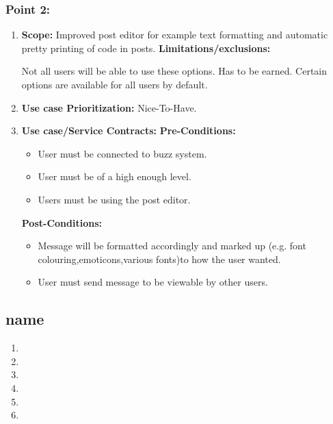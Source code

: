 \documentclass[11pt]{article}
\begin{document}
\subsubsection{Point 2:} 
\begin{enumerate}
\item 
\textbf{Scope:}
Improved post editor for example text formatting and automatic pretty printing of code in posts.
\newline
\textbf{Limitations/exclusions:} 

Not all users will be able to use these options. Has to be earned. Certain options are available for all users by default.

\item 
\textbf{Use case Prioritization:} Nice-To-Have.

\item 
\textbf{Use case/Service Contracts:} 
\newline
\textbf{Pre-Conditions: }
\begin{itemize}
\item User must be connected to buzz system.
\item User must be of a high enough level.
\item Users must be using the post editor.
\end{itemize}
 

\textbf{Post-Conditions: }
\begin{itemize}

\item Message will be formatted accordingly and marked up (e.g. font colouring,emoticons,various fonts)to how the user wanted. 
\item User must send message to be viewable by other users.
\end{itemize}
\end{enumerate}

\newpage

\subsection{name}
\begin{enumerate}
\item 
\item 
\item 
\item 
\item 
\item 
\end{enumerate}

\newpage
\end{document}
